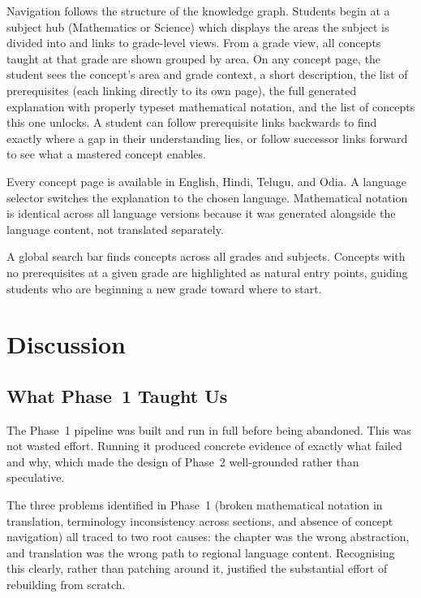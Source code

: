 \documentclass[12pt,a4paper]{article}
\begin{document}
Navigation follows the structure of the knowledge graph.
Students begin at a subject hub (Mathematics or Science) which displays the areas the subject
is divided into and links to grade-level views.
From a grade view, all concepts taught at that grade are shown grouped by area.
On any concept page, the student sees the concept's area and grade context,
a short description, the list of prerequisites (each linking directly to its own page),
the full generated explanation with properly typeset mathematical notation,
and the list of concepts this one unlocks.
A student can follow prerequisite links backwards to find exactly where a gap in their
understanding lies, or follow successor links forward to see what a mastered concept enables.

Every concept page is available in English, Hindi, Telugu, and Odia.
A language selector switches the explanation to the chosen language.
Mathematical notation is identical across all language versions because it was generated
alongside the language content, not translated separately.

A global search bar finds concepts across all grades and subjects.
Concepts with no prerequisites at a given grade are highlighted as natural entry points,
guiding students who are beginning a new grade toward where to start.

\section{Discussion}

\subsection{What Phase~1 Taught Us}

The Phase~1 pipeline was built and run in full before being abandoned.
This was not wasted effort.
Running it produced concrete evidence of exactly what failed and why,
which made the design of Phase~2 well-grounded rather than speculative.

The three problems identified in Phase~1 (broken mathematical notation in translation,
terminology inconsistency across sections, and absence of concept navigation)
all traced to two root causes: the chapter was the wrong abstraction,
and translation was the wrong path to regional language content.
Recognising this clearly, rather than patching around it, justified the substantial
effort of rebuilding from scratch.
\end{document}
